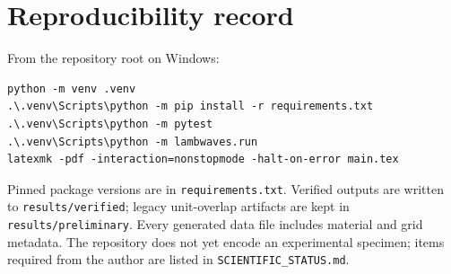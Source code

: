 \chapter{Reproducibility record}\label{app:reproducibility}
From the repository root on Windows:
\begin{verbatim}
python -m venv .venv
.\.venv\Scripts\python -m pip install -r requirements.txt
.\.venv\Scripts\python -m pytest
.\.venv\Scripts\python -m lambwaves.run
latexmk -pdf -interaction=nonstopmode -halt-on-error main.tex
\end{verbatim}
Pinned package versions are in \texttt{requirements.txt}. Verified outputs are
written to \texttt{results/verified}; legacy unit-overlap artifacts are kept in
\texttt{results/preliminary}. Every generated data file includes material and
grid metadata. The repository does not yet encode an experimental specimen;
items required from the author are listed in \texttt{SCIENTIFIC\_STATUS.md}.
